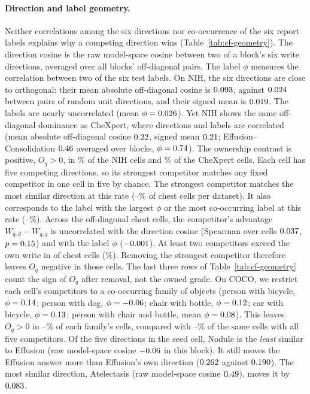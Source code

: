 \paragraph{Direction and label geometry.} Neither correlations among the six directions nor co-occurrence of the six report labels explains why a competing direction wins (Table~\ref{tab:cf-geometry}). The direction cosine is the raw model-space cosine between two of a block's six write directions, averaged over all blocks' off-diagonal pairs. The label $\phi$ measures the correlation between two of the six test labels. On NIH, the six directions are close to orthogonal: their mean absolute off-diagonal cosine is $0.093$, against $0.024$ between pairs of random unit directions, and their signed mean is $0.019$. The labels are nearly uncorrelated (mean $\phi=0.026$). Yet NIH shows the same off-diagonal dominance as CheXpert, where directions and labels are correlated (mean absolute off-diagonal cosine $0.22$, signed mean $0.21$; Effusion--Consolidation $0.46$ averaged over blocks, $\phi=0.74$). The ownership contrast is positive, $O_q>0$, in \cfGeoOwnWinsNihPct\% of the \cfNihCells{} NIH cells and \cfGeoOwnWinsChexPct\% of the \cfChexCells{} CheXpert cells. Each cell has five competing directions, so its strongest competitor matches any fixed competitor in one cell in five by chance. The strongest competitor matches the most similar direction at this rate (\cfGeoChanceCosMin{}--\cfGeoChanceCosMax\% of chest cells per dataset). It also corresponds to the label with the largest $\phi$ or the most co-occurring label at this rate (\cfGeoChanceLabelMin{}--\cfGeoChanceLabelMax\%). Across the \cfGeoOffdiagCells{} off-diagonal chest cells, the competitor's advantage $W_{q,d}-W_{q,q}$ is uncorrelated with the direction cosine (Spearman over cells $0.037$, $p=0.15$) and with the label $\phi$ ($-0.001$). At least two competitors exceed the own write in \cfGeoTwoAbove{} of \cfGeoTwoAboveN{} chest cells (\cfGeoTwoAbovePct\%). Removing the strongest competitor therefore leaves $O_q$ negative in those cells. The last three rows of Table~\ref{tab:cf-geometry} count the sign of $O_q$ after removal, not the owned grade. On COCO, we restrict each cell's competitors to a co-occurring family of objects (person with bicycle, $\phi=0.14$; person with dog, $\phi=-0.06$; chair with bottle, $\phi=0.12$; car with bicycle, $\phi=0.13$; person with chair and bottle, mean $\phi=0.08$). This leaves $O_q>0$ in \cfGeoCocoFamMinPct{}--\cfGeoCocoFamMaxPct\% of each family's cells, compared with \cfGeoCocoFamFullMinPct{}--\cfGeoCocoFamFullMaxPct\% of the same cells with all five competitors. Of the five directions in the seed cell, Nodule is the \emph{least} similar to Effusion (raw model-space cosine $-0.06$ in this block). It still moves the Effusion answer more than Effusion's own direction ($0.262$ against $0.190$). The most similar direction, Atelectasis (raw model-space cosine $0.49$), moves it by $0.083$.

